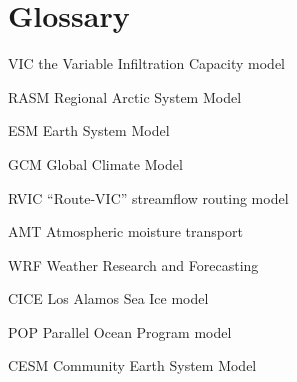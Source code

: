 %
%


\copyrightpage

\titlepage

\setcounter{page}{-1}

%
%
\tableofcontents
\listoffigures
\listoftables  %

\chapter*{Glossary}      %
\thispagestyle{plain}
%
\begin{glossary}
\item[VIC] the Variable Infiltration Capacity model
\item[RASM] Regional Arctic System Model
\item[ESM] Earth System Model
\item[GCM] Global Climate Model
\item[RVIC] ``Route-VIC'' streamflow routing model
\item[AMT] Atmospheric moisture transport
\item[WRF] Weather Research and Forecasting
\item[CICE] Los Alamos Sea Ice model
\item[POP] Parallel Ocean Program model
\item[CESM] Community Earth System Model
\end{glossary}

